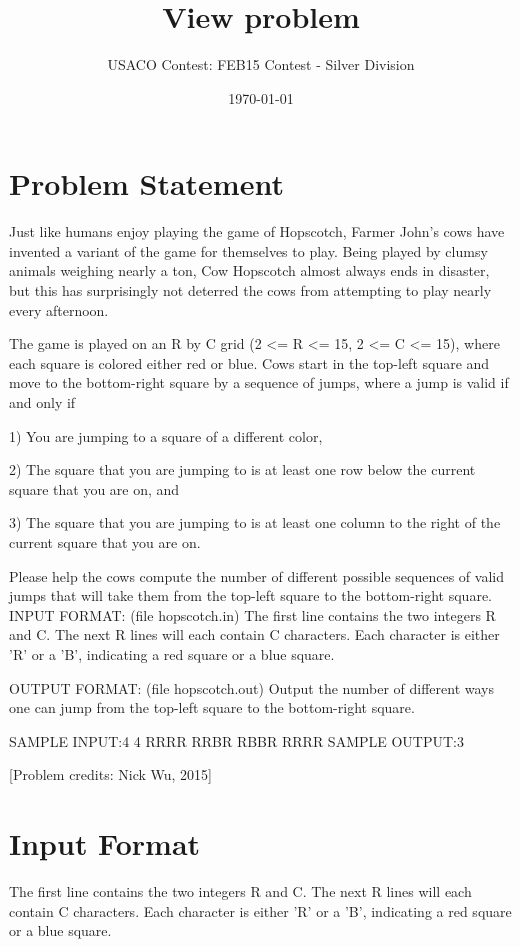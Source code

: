 \documentclass[12pt]{article}
\title{View problem}
\author{USACO Contest: FEB15 Contest - Silver Division}
\date{\today}
\begin{document}
\maketitle

\section*{Problem Statement}

Just like humans enjoy playing the game of Hopscotch, Farmer John's cows have invented a variant of the game for themselves to play.  Being played by clumsy animals weighing nearly a ton, Cow Hopscotch almost always ends in disaster, but this has surprisingly not deterred the cows from attempting to play nearly every afternoon.

The game is played on an R by C grid (2 <= R <= 15, 2 <= C <= 15), where each square is colored either red or blue.  Cows start in the top-left square and move to the bottom-right square by a sequence of jumps, where a jump is valid if and only if

1) You are jumping to a square of a different color,

2) The square that you are jumping to is at least one row below the current square that you are on, and

3) The square that you are jumping to is at least one column to the right of the current square that you are on.

Please help the cows compute the number of different possible sequences of valid jumps that will take them from the top-left square to the bottom-right square.
INPUT FORMAT: (file hopscotch.in)
The first line contains the two integers R and C.  The next R lines will each contain C characters. Each character is either 'R' or a 'B', indicating a red square or a blue square.

OUTPUT FORMAT: (file hopscotch.out)
Output the number of different ways one can jump from the top-left square to the bottom-right square.

SAMPLE INPUT:4 4
RRRR
RRBR
RBBR
RRRR
SAMPLE OUTPUT:3


[Problem credits: Nick Wu, 2015]



\section*{Input Format}
The first line contains the two integers R and C.  The next R lines will each contain C characters. Each character is either 'R' or a 'B', indicating a red square or a blue square.
\end{document}
